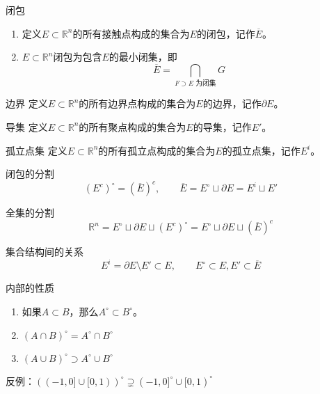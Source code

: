\documentclass[lang = cn, scheme = chinese, thmcnt = section]{elegantbook}
\newcommand{\R}{\mathbb{R}}            %
\newcommand{\sub}{\subset}             %
\begin{document}
\begin{definition}{闭包}
	\begin{enumerate}
		\item 定义$E\sub\R^n$的所有接触点构成的集合为$E$的闭包，记作$\overline{E}$。
		\item $E\sub\R^n$闭包为包含$E$的最小闭集，即%
		$$
		\overline{E}=\bigcap_{F\supset E\text{ 为闭集}}G
		$$
	\end{enumerate}
\end{definition}

\begin{definition}{边界}
	定义$E\sub\R^n$的所有边界点构成的集合为$E$的边界，记作$\partial E$。
\end{definition}

\begin{definition}{导集}
	定义$E\sub\R^n$的所有聚点构成的集合为$E$的导集，记作$E'$。
\end{definition}

\begin{definition}{孤立点集}
	定义$E\sub\R^n$的所有孤立点构成的集合为$E$的孤立点集，记作$E^i$。
\end{definition}

\begin{theorem}{闭包的分割}
	$$
	(E^c)^\circ=(\overline{E})^c,\qquad 
	\overline{E}=E^\circ\sqcup \partial E=E^i\sqcup E'
	$$
\end{theorem}

\begin{theorem}{全集的分割}
	$$
	\R^n=E^\circ\sqcup \partial E\sqcup (E^c)^\circ=E^\circ\sqcup \partial E\sqcup (\overline{E})^c
	$$
\end{theorem}

\begin{proposition}{集合结构间的关系}
	$$
	E^i=\partial E\setminus E'\sub E,\qquad 
	E^\circ\sub E,E'\sub \overline{E}
	$$
\end{proposition}

\begin{proposition}{内部的性质}
	\begin{enumerate}
		\item 如果$A\sub B$，那么$A^\circ\sub B^\circ$。
		\item $(A\cap B)^\circ=A^\circ\cap B^\circ$
		\item $(A\cup B)^\circ \supset A^\circ\cup B^\circ$
	\end{enumerate}
\end{proposition}

\begin{note}
	反例：$((-1,0]\cup[0,1))^\circ\supsetneq (-1,0]^\circ\cup[0,1)^\circ$
\end{note}
\end{document}
